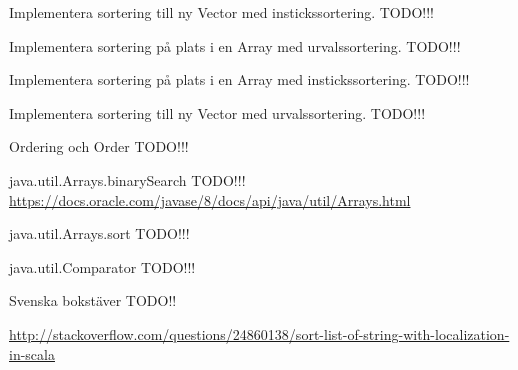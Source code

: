 \Task Implementera sortering till ny Vector med instickssortering. TODO!!!


\Task Implementera sortering på plats i en Array med urvalssortering. TODO!!!



\ExtraTasks %


\Task Implementera sortering på plats i en Array med instickssortering. TODO!!!


\Task Implementera sortering till ny Vector med urvalssortering. TODO!!!


\AdvancedTasks %

\Task  Ordering och Order TODO!!!

\Task java.util.Arrays.binarySearch  TODO!!! \\ \url{https://docs.oracle.com/javase/8/docs/api/java/util/Arrays.html}

\Task java.util.Arrays.sort  TODO!!!

\Task java.util.Comparator  TODO!!!

\Task Svenska bokstäver TODO!!

\url{http://stackoverflow.com/questions/24860138/sort-list-of-string-with-localization-in-scala} 


    